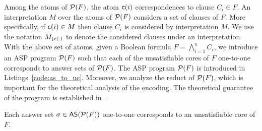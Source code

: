 Among the atoms of $\mathcal{P}(F)$, the atom $\mathsf{c}(i)$ correspondences to clause $C_i \in F$. 
An interpretation $M$ over the atoms of $\mathcal{P}(F)$ considers a set of clauses of $F$.
More specifically, if $\mathsf{c}(i) \in M$ then clause $C_i$ is considered by interpretation $M$.
We use the notation $M_{\downarrow \mathsf{c}(.)}$ to denote the considered clauses under an interpretation. 
With the above set of atoms, given a Boolean formula $F = \bigwedge_{i=1}^{n} C_i$, we introduce an ASP program $\mathcal{P}(F)$ such that each of the unsatisfiable cores of $F$ one-to-one corresponds to answer sets of $\mathcal{P}(F)$. 
The ASP program $\mathcal{P}(F)$ is introduced in Listings~\ref{code:as_to_uc}. 
Moreover, we analyze the reduct of $\mathcal{P}(F)$, which is important for the theoretical analysis of the encoding. The theoretical guarantee of the program is established in~.
\begin{lemma}
  \label{lemma:as_to_uc_proof}
  Each answer set $\sigma \in \mathsf{AS}(\mathcal{P}(F))$ one-to-one corresponds to an unsatisfiable core of $F$.
\end{lemma}
